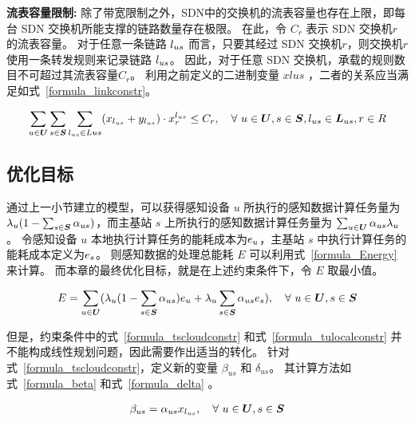 \textbf{流表容量限制:}
除了带宽限制之外，SDN中的交换机的流表容量也存在上限，即每台 SDN 交换机所能支撑的链路数量存在极限。
在此，令 $C_r$ 表示 SDN 交换机$r$的流表容量。
对于任意一条链路 $l_{us}$ 而言，只要其经过 SDN 交换机$r$，则交换机$r$使用一条转发规则来记录链路 $l_{us}$。
因此，对于任意 SDN 交换机，承载的规则数目不可超过其流表容量$C_r$。
利用之前定义的二进制变量 $xlus$ ，二者的关系应当满足如式~\eqref{formula_linkconstr}。

\begin{equation}
\label{formula_linkconstr}
\begin{gathered}
\sum\limits_{u \in \boldsymbol{U}}\sum\limits_{s \in \boldsymbol{S}}\sum\limits_{l_{us} \in Lus}(x_{l_{us}} + y_{l_{us}}) \cdot x^{l_{us}}_{r} \leq C_r,
\quad  \forall\ u \in \boldsymbol{U}, s \in \boldsymbol{S}, l_{us} \in \boldsymbol{L}_{us}, r\in R\\
\end{gathered}
\end{equation}

\subsection{优化目标}

通过上一小节建立的模型，可以获得感知设备 $u$ 所执行的感知数据计算任务量为 ${\lambda}_{u}(1-\sum_{s\in \boldsymbol{S}}{\alpha}_{us})$，而主基站 $s$ 上所执行的感知数据计算任务量为 $\sum_{u\in \boldsymbol{U}}{\alpha}_{us}{\lambda}_{u}$。
令感知设备 $u$ 本地执行计算任务的能耗成本为$e_u$，主基站 $s$ 中执行计算任务的能耗成本定义为$e_s$。
则感知数据的处理总能耗 $E$ 可以利用式~\eqref{formula_Energy} 来计算。
而本章的最终优化目标，就是在上述约束条件下，令 $E$ 取最小值。

\begin{equation}
\label{formula_Energy}
  \begin{gathered}
    E = \sum\limits_{u\in \boldsymbol{U}}({\lambda}_{u}(1-\sum\limits_{s\in \boldsymbol{S}}{\alpha}_{us})e_u + {\lambda}_{u}\sum\limits_{s\in \boldsymbol{S}}{\alpha}_{us}e_s),
    \quad \forall\ u \in \boldsymbol{U}, s \in \boldsymbol{S}
  \end{gathered}
\end{equation}

但是，约束条件中的式~\eqref{formula_tscloudconstr} 和式~\eqref{formula_tulocalconstr} 并不能构成线性规划问题，因此需要作出适当的转化。
针对式~\eqref{formula_tscloudconstr}，定义新的变量 $\beta_{us}$ 和 $\delta_{us}$。
其计算方法如式~\eqref{formula_beta} 和式~\eqref{formula_delta} 。

\begin{equation}
  \label{formula_beta}
  \begin{gathered}
    \beta_{us} = {\alpha}_{us} x_{l_{us}},
    \quad \forall\ u \in \boldsymbol{U}, s \in \boldsymbol{S}
  \end{gathered}
\end{equation}

